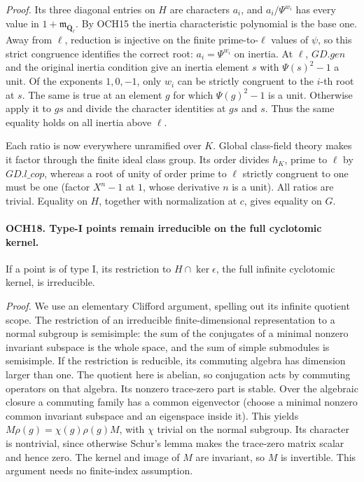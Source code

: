 \documentclass[11pt,a4paper]{article}
\numberwithin{equation}{section}
\theoremstyle{remark}\newtheorem{remark}[theorem]{Remark}
\begin{document}
\emph{Proof.}
Its three diagonal entries on \(H\) are characters \(a_i\),
and \(a_i/\Psi^{w_i}\) has every value in
\(1+\mathfrak m_{\overline{\mathbf Q}_\ell}\).
By OCH15 the inertia characteristic polynomial is the base one.
Away from \(\ell\), reduction is injective on the finite
prime-to-\(\ell\) values of \(\psi\), so this strict
congruence identifies the correct root:
\(a_i=\Psi^{w_i}\) on inertia.  At \(\ell\), \(GD.gen\)
and the original inertia condition give an inertia element \(s\)
with \(\Psi(s)^2-1\) a unit.  Of the exponents \(1,0,-1\),
only \(w_i\) can be strictly congruent to the \(i\)-th root
at \(s\).  The same is true at an element \(g\) for which
\(\Psi(g)^2-1\) is a unit.  Otherwise apply it to \(gs\)
and divide the character identities at \(gs\) and \(s\).
Thus the same equality holds on all inertia above \(\ell\).

Each ratio is now everywhere unramified over \(K\).  Global
class-field theory makes it factor through the finite ideal class
group.  Its order divides \(h_K\), prime to \(\ell\) by
\(GD.l\_\allowbreak cop\), whereas a root of unity of order prime to
\(\ell\) strictly congruent to one must be one (factor
\(X^n-1\) at \(1\), whose derivative \(n\) is a unit).
All ratios are trivial.  Equality on \(H\), together with
normalization at \(c\), gives equality on \(G\).

\paragraph{OCH18. Type-I points remain irreducible on the full cyclotomic kernel.}
\label{claim:OCH18}
If a point is of type I, its restriction to
\(H\cap\ker\epsilon\), the full infinite cyclotomic kernel,
is irreducible.

\emph{Proof.}
We use an elementary Clifford argument, spelling out its infinite
quotient scope.  The restriction of an irreducible finite-dimensional
representation to a normal subgroup is semisimple: the sum of the
conjugates of a minimal nonzero invariant subspace is the whole
space, and the sum of simple submodules is semisimple.  If the
restriction is reducible, its commuting algebra has dimension
larger than one.  The quotient here is abelian, so conjugation
acts by commuting operators on that algebra.  Its nonzero trace-zero
part is stable.  Over the algebraic closure a commuting family has
a common eigenvector (choose a minimal nonzero common invariant
subspace and an eigenspace inside it).  This yields
\(M\rho(g)=\chi(g)\rho(g)M\), with \(\chi\) trivial on
the normal subgroup.  Its character is nontrivial, since otherwise
Schur's lemma makes the trace-zero matrix scalar and hence zero.
The kernel and image of \(M\) are invariant, so \(M\) is
invertible.  This argument needs no finite-index assumption.
\end{document}

